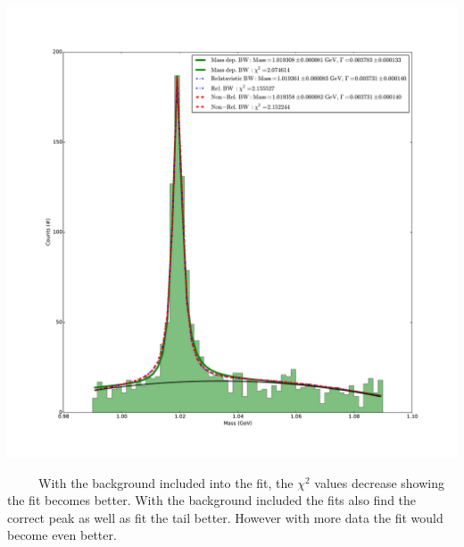 \documentclass[pdftex]{article}
\begin{document}
\begin{enumerate}
		\includegraphics[scale=0.35]{Problem_3_withbackfit.pdf}

		\ \ \ \ \ With the background included into the fit, the $\chi^2$ values decrease showing the fit 
		becomes better.  With the background included the fits also find the correct peak as well as
		fit the tail better.  However with more data the fit would become even better.



\end{enumerate}
\end{document}
